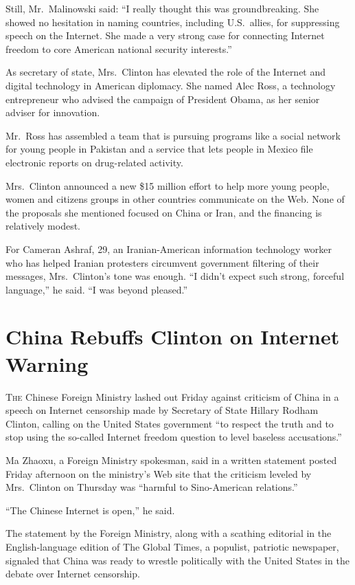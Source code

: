 ﻿\documentclass[12pt]{article}
\begin{document}
Still, Mr.~Malinowski said: ``I really thought this was groundbreaking. She showed no hesitation in
naming countries, including U.S.~allies, for suppressing speech on the Internet. She made a very
strong case for connecting Internet freedom to core American national security interests.''

As secretary of state, Mrs.~Clinton has elevated the role of the Internet and digital technology in
American diplomacy. She named Alec Ross, a technology entrepreneur who advised the campaign of
President Obama, as her senior adviser for innovation.

Mr.~Ross has assembled a team that is pursuing programs like a social network for young people in
Pakistan and a service that lets people in Mexico file electronic reports on drug-related activity.

Mrs.~Clinton announced a new \$15 million effort to help more young people, women and citizens
groups in other countries communicate on the Web. None of the proposals she mentioned focused on
China or Iran, and the financing is relatively modest.

For Cameran Ashraf, 29, an Iranian-American information technology worker who has helped Iranian
protesters circumvent government filtering of their messages, Mrs.~Clinton's tone was enough. ``I
didn't expect such strong, forceful language,'' he said. ``I was beyond pleased.''

\section{China Rebuffs Clinton on Internet Warning}

\lettrine{T}{he} Chinese Foreign Ministry lashed out Friday against
criticism of China in a speech on Internet censorship made by Secretary of State Hillary Rodham
Clinton, calling on the United States government ``to respect the truth and to stop using the
so-called Internet freedom question to level baseless accusations.''

Ma Zhaoxu, a Foreign Ministry spokesman, said in a written statement posted Friday afternoon on the
ministry's Web site that the criticism leveled by Mrs.~Clinton on Thursday was ``harmful to
Sino-American relations.''

``The Chinese Internet is open,'' he said.

The statement by the Foreign Ministry, along with a scathing editorial in the English-language
edition of The Global Times, a populist, patriotic newspaper, signaled that China was ready to
wrestle politically with the United States in the debate over Internet censorship.
\end{document}
